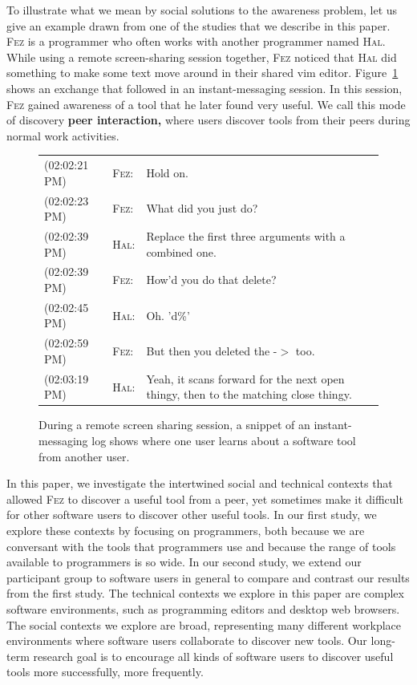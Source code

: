 \documentclass[smallextended]{svjour3}
\newcommand\gc{\rowcolor[rgb]{0.93,0.93,0.93}}
\newcommand\discovery{peer interaction\xspace}
\newcommand\context{mode\xspace}
\newcommand{\subject}[1]{\textsc{#1}}
\newcommand{\csub}{{\subject{Eli}}\xspace}
\newcommand{\hsub}{{\subject{Fez}}\xspace}
\newcommand{\psub}{{\subject{Hal}}\xspace}
\begin{document}
To illustrate what we mean by social solutions to the awareness problem, let us
give an example drawn from one of the studies that we describe in this paper.
\hsub is a programmer who often works with another programmer named
\psub. While using a remote screen-sharing session together, \hsub noticed that \psub
did something to make some text move around in their shared vim
editor. 
Figure~\ref{fig:pairRemoting} shows an exchange that followed in an
instant-messaging session.
In this session, \hsub gained awareness of a tool that he later found very
useful.
We call this \context of discovery \textbf{\discovery,} where users discover
tools from their peers during normal work activities.

\begin{figure}[t]
	\renewcommand{\arraystretch}{1.4} 
	\centering
	\begin{tabularx}{\linewidth}{|llX|}	
		
\gc		(02:02:21 PM)&\hsub:&Hold on.\\
\gc		(02:02:23 PM)&\hsub:&What did you just do?\\
		(02:02:39 PM)&\psub:&Replace the first three 
						     arguments with a combined one. \\	
\gc		(02:02:39 PM)&\hsub:&How'd you do that delete?\\
		(02:02:45 PM)&\psub:&Oh. 'd\%'\\
\gc		(02:02:59 PM)&\hsub:&But then you deleted the -$>$ too.\\
		(02:03:19 PM)&\psub:&Yeah, it scans forward for the next open thingy,
							 then to the matching close thingy.\\
		\hline
        
	\end{tabularx}
	\caption{During a remote screen sharing session, a snippet of an instant-messaging log shows
	where one user learns about a software tool from another user.}\label{fig:pairRemoting}
\end{figure}

In this paper, we investigate the intertwined social and technical contexts that allowed
\hsub to discover a useful tool from a peer, yet sometimes
make it difficult for other software users to discover other useful tools.
In our first study, we explore these contexts by focusing on programmers, both because we are conversant
with the tools that programmers use and because the range of tools available to programmers is so wide.
In our second study, we extend our participant group to software users in general
to compare and contrast our results from the first study.
The technical contexts we explore in this paper are complex software environments, such as 
programming editors and desktop web browsers.
The social contexts we explore are broad, representing many different workplace environments where 
software users collaborate to discover new tools.
Our long-term research goal is to encourage all kinds of software users to 
discover useful tools more successfully, more frequently.
\end{document}
